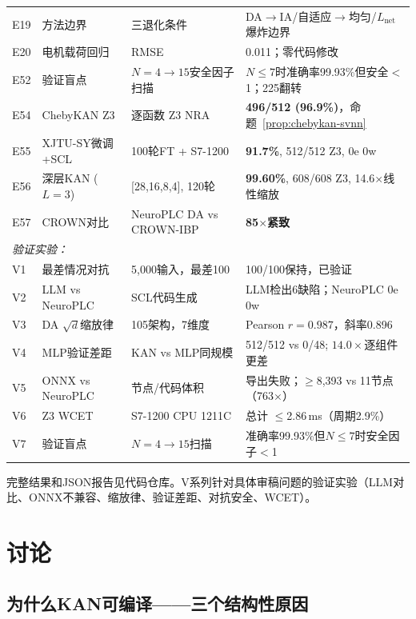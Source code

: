 \documentclass[journal,onecolumn]{IEEEtran}
\theoremstyle{definition}
\theoremstyle{plain}
\theoremstyle{remark}
\begin{document}
\begin{table}[tb]
\begin{tabular}{@{}p{0.7cm}p{2.2cm}p{2.0cm}p{2.2cm}@{}}
E19& 方法边界 & 三退化条件 & DA$\to$IA/自适应$\to$均匀/$L_{\text{net}}$爆炸边界 \\
E20& 电机载荷回归 & RMSE & 0.011；零代码修改 \\
E52& 验证盲点 & $N{=}4{\to}15$安全因子扫描 & $N{\le}7$时准确率99.93\%但安全$<$1；225翻转 \\
E54& ChebyKAN Z3 & 逐函数 Z3 NRA   & \textbf{496/512 (96.9\%)}，命题~\ref{prop:chebykan-svnn} \\
E55& XJTU-SY微调+SCL & 100轮FT + S7-1200 & \textbf{91.7\%}, 512/512 Z3, 0e 0w \\
E56& 深层KAN ($L{=}3$) & [28,16,8,4], 120轮 & \textbf{99.60\%}, 608/608 Z3, 14.6$\times$线性缩放 \\
E57& CROWN对比 & NeuroPLC DA vs CROWN-IBP & \textbf{85$\times$紧致} \\
\midrule
\multicolumn{4}{l}{\textit{验证实验：}} \\
V1 & 最差情况对抗   & 5,000输入，最差100  & 100/100保持，已验证 \\
V2 & LLM vs NeuroPLC           & SCL代码生成   & LLM检出6缺陷；NeuroPLC 0e 0w \\
V3 & DA $\sqrt{d}$缩放律 & 105架构，7维度 & Pearson $r{=}0.987$，斜率0.896 \\
V4 & MLP验证差距      & KAN vs MLP同规模 & 512/512 vs 0/48; $14.0\times$逐组件更差 \\
V5 & ONNX vs NeuroPLC    & 节点/代码体积    & 导出失败；$\ge$8,393 vs 11节点（763$\times$） \\
V6 & Z3 WCET        & S7-1200 CPU 1211C   & 总计 $\leq$2.86\,ms（周期2.9\%） \\
V7 & 验证盲点   & $N{=}4{\to}15$扫描 & 准确率99.93\%但$N{\le}7$时安全因子$<$1 \\
\bottomrule
\end{tabular}
\vspace{1pt}
{\scriptsize 完整结果和JSON报告见代码仓库。V系列针对具体审稿问题的验证实验（LLM对比、ONNX不兼容、缩放律、验证差距、对抗安全、WCET）。}
\end{table}

\section{讨论}
\label{sec:discussion}

\subsection{为什么KAN可编译——三个结构性原因}
\end{document}
